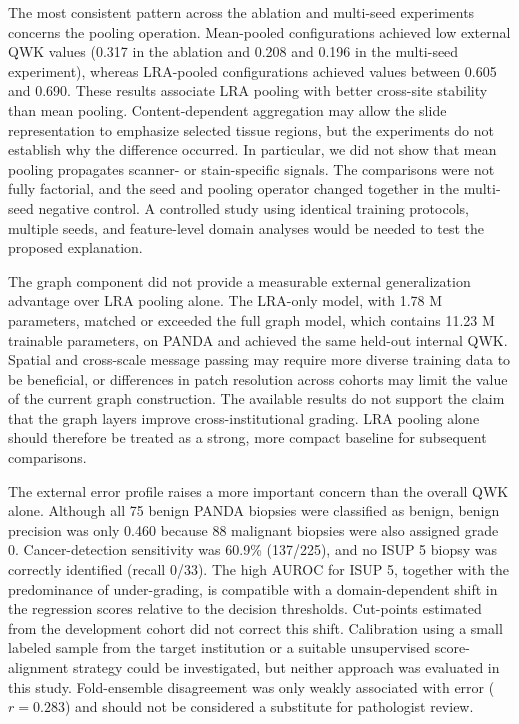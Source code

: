 \documentclass[11pt,a4paper]{article}
\begin{document}
The most consistent pattern across the ablation and multi-seed experiments concerns the pooling operation. Mean-pooled configurations achieved low external QWK values (0.317 in the ablation and 0.208 and 0.196 in the multi-seed experiment), whereas LRA-pooled configurations achieved values between 0.605 and 0.690. These results associate LRA pooling with better cross-site stability than mean pooling. Content-dependent aggregation may allow the slide representation to emphasize selected tissue regions, but the experiments do not establish why the difference occurred. In particular, we did not show that mean pooling propagates scanner- or stain-specific signals. The comparisons were not fully factorial, and the seed and pooling operator changed together in the multi-seed negative control. A controlled study using identical training protocols, multiple seeds, and feature-level domain analyses would be needed to test the proposed explanation.

The graph component did not provide a measurable external generalization advantage over LRA pooling alone. The LRA-only model, with 1.78 M parameters, matched or exceeded the full graph model, which contains 11.23 M trainable parameters, on PANDA and achieved the same held-out internal QWK. Spatial and cross-scale message passing may require more diverse training data to be beneficial, or differences in patch resolution across cohorts may limit the value of the current graph construction. The available results do not support the claim that the graph layers improve cross-institutional grading. LRA pooling alone should therefore be treated as a strong, more compact baseline for subsequent comparisons.

The external error profile raises a more important concern than the overall QWK alone. Although all 75 benign PANDA biopsies were classified as benign, benign precision was only 0.460 because 88 malignant biopsies were also assigned grade 0. Cancer-detection sensitivity was 60.9\% (137/225), and no ISUP 5 biopsy was correctly identified (recall 0/33). The high AUROC for ISUP 5, together with the predominance of under-grading, is compatible with a domain-dependent shift in the regression scores relative to the decision thresholds. Cut-points estimated from the development cohort did not correct this shift. Calibration using a small labeled sample from the target institution or a suitable unsupervised score-alignment strategy could be investigated, but neither approach was evaluated in this study. Fold-ensemble disagreement was only weakly associated with error ($r = 0.283$) and should not be considered a substitute for pathologist review.
\end{document}
